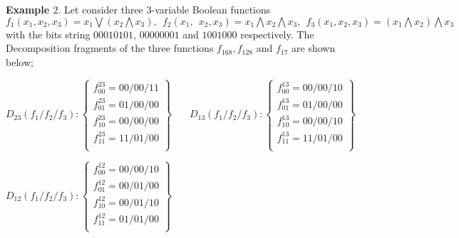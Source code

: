 \documentclass{article}
\begin{document}
 \textbf{Example $2.$} Let consider three $3$-variable Boolean functions $f_{1} (x_{1},x_{2},x_{3})= x_{1} \bigvee ( x_{2} \bigwedge x_{3} ),\:\:  f_{2} (x_{1},\:\:x_{2},x_{3})=  x_{1} \bigwedge x_{2} \bigwedge x_{3} ,\:\:  f_{3} (x_{1},x_{2},x_{3})= ( x_{1} \bigwedge  x_{2} ) \bigwedge x_{3}$ with the bits string $00010101$, $00000001$ and $1001000 $ respectively. The Decomposition fragments of the three functions $f_{168},f_{128}$ and $f_{17}$ are shown below;
 
 \begin{center}
    \resizebox{12cm}{!}
    {
$D_{23}(f_{1}/f_{2}/f_{3}) :\left \lbrace \begin{array}{c}
    
         f_{00}^{23}=00/00/11\\
         f_{01}^{23}=01/00/00\\
         f_{10}^{23}=00/00/00\\
         f_{11}^{23}=11/01/00\\
                          			
    \end{array} \right\rbrace$ $\:\:\:\:\:$
    $D_{13}(f_{1}/f_{2}/f_{3}) :\left \lbrace \begin{array}{c}
      
         f_{00}^{13}=00/00/10\\
         f_{01}^{13}=01/00/00\\
         f_{10}^{13}=00/00/10\\
         f_{11}^{13}=11/01/00\\
                            			
    \end{array} \right\rbrace$ 
    } \end{center}
    
     \begin{center}
            
    \resizebox{6cm}{!}
            {


        $D_{12}(f_{1}/f_{2}/f_{3}) :\left \lbrace \begin{array}{c}
            
             f_{00}^{12}=00/00/10\\
             f_{01}^{12}=00/01/00\\
             f_{10}^{12}=00/01/10\\
             f_{11}^{12}=01/01/00\\
                                  			
         \end{array} \right\rbrace$ }
      \end{center}
    
\end{document}
